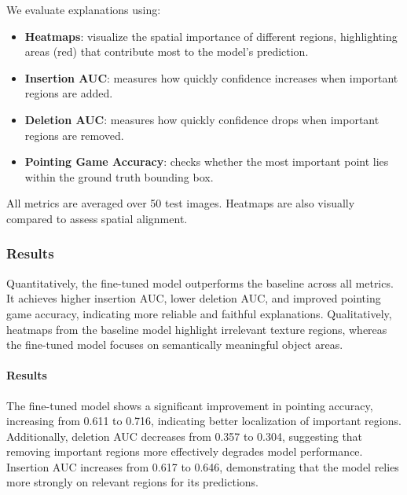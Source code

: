 We evaluate explanations using:
\begin{itemize}
    \item \textbf{Heatmaps}: visualize the spatial importance of different regions, highlighting areas (red) that contribute most to the model's prediction.
    \item \textbf{Insertion AUC}: measures how quickly confidence increases when important regions are added.
    \item \textbf{Deletion AUC}: measures how quickly confidence drops when important regions are removed.
    \item \textbf{Pointing Game Accuracy}: checks whether the most important point lies within the ground truth bounding box.
\end{itemize}

All metrics are averaged over 50 test images. Heatmaps are also visually compared to assess spatial alignment.

\subsubsection{Results}
Quantitatively, the fine-tuned model outperforms the baseline across all metrics. It achieves higher insertion AUC, lower deletion AUC, and improved pointing game accuracy, indicating more reliable and faithful explanations. Qualitatively, heatmaps from the baseline model highlight irrelevant texture regions, whereas the fine-tuned model focuses on semantically meaningful object areas.

\paragraph{Results}

\begin{table}[h]
\centering
\footnotesize
\setlength{\tabcolsep}{3pt}
\end{table}

The fine-tuned model shows a significant improvement in pointing accuracy, increasing from 0.611 to 0.716, indicating better localization of important regions. Additionally, deletion AUC decreases from 0.357 to 0.304, suggesting that removing important regions more effectively degrades model performance. Insertion AUC increases from 0.617 to 0.646, demonstrating that the model relies more strongly on relevant regions for its predictions.

